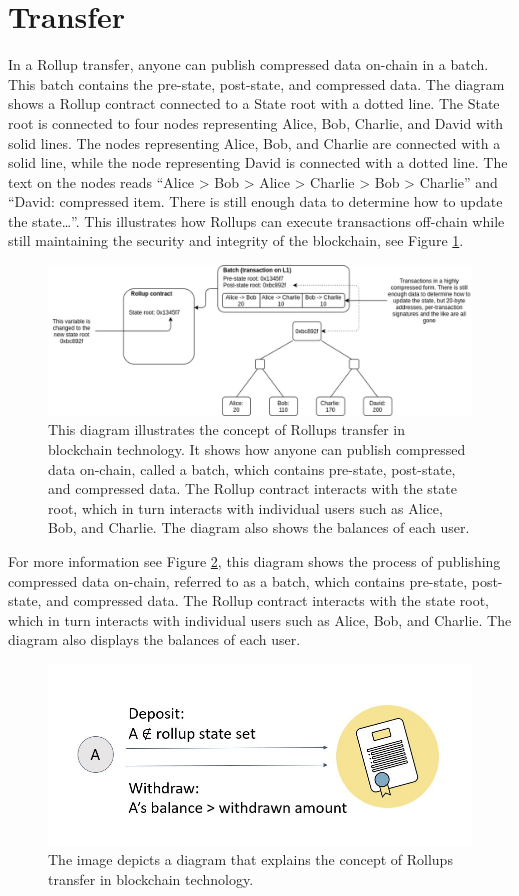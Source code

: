 \documentclass{report}
\begin{document}
\section{Transfer}
In a Rollup transfer, anyone can publish compressed data on-chain in a batch. This batch contains the pre-state, post-state, and compressed data. The diagram shows a Rollup contract connected to a State root with a dotted line. The State root is connected to four nodes representing Alice, Bob, Charlie, and David with solid lines. The nodes representing Alice, Bob, and Charlie are connected with a solid line, while the node representing David is connected with a dotted line. The text on the nodes reads “Alice > Bob > Alice > Charlie > Bob > Charlie” and “David: compressed item. There is still enough data to determine how to update the state…”. This illustrates how Rollups can execute transactions off-chain while still maintaining the security and integrity of the blockchain, see Figure \ref{fig:f2}.
\begin{center}
	\begin{figure}
		\centering
		\includegraphics[width=0.8\linewidth]{Fig/F2}
		\caption{This diagram illustrates the concept of Rollups transfer in blockchain technology. It shows how anyone can publish compressed data on-chain, called a batch, which contains pre-state, post-state, and compressed data. The Rollup contract interacts with the state root, which in turn interacts with individual users such as Alice, Bob, and Charlie. The diagram also shows the balances of each user.
		}
		\label{fig:f2}
	\end{figure}
\end{center}
For more information see Figure \ref{fig:f3}, this diagram shows the process of publishing compressed data on-chain, referred to as a batch, which contains pre-state, post-state, and compressed data. The Rollup contract interacts with the state root, which in turn interacts with individual users such as Alice, Bob, and Charlie. The diagram also displays the balances of each user.
\begin{center}
	\begin{figure}
		\centering
		\includegraphics[width=0.8\linewidth]{Fig/F3}
		\caption{The image depicts a diagram that explains the concept of Rollups transfer in blockchain technology.
		}
		\label{fig:f3}
	\end{figure}
\end{center}
\end{document}
